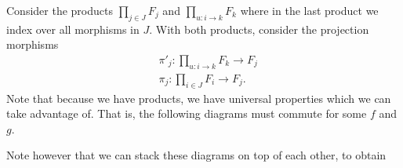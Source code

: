     \begin{prf}
        Consider the products $\displaystyle \prod_{j \in J}F_j$ and 
        $\displaystyle \prod_{u: i \to k}F_k$ where in the last product we 
        index over all morphisms in $J$. 
        With both products, consider the projection morphisms
        \begin{align*}
            &\pi'_j: \prod_{u:i \to k}F_k \to F_j\\
            &\pi_j: \prod_{i \in J}F_i \to F_j.
        \end{align*}
        Note that because we have products, we have universal
        properties which we can take advantage of. That is, 
        the following diagrams must commute for some $f$ and $g$. 
        \begin{center}
            \hspace{1cm}
        \end{center}
        Note however that we can stack these diagrams on top of each other, to obtain  
        \begin{center}
\end{center}
\end{prf}
